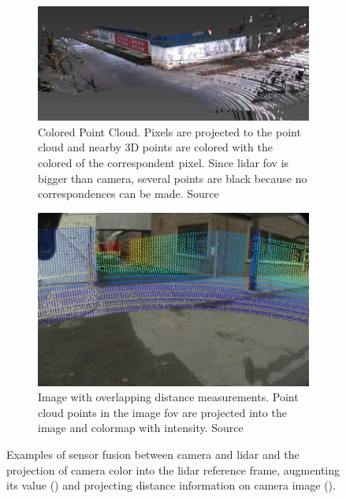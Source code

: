 \begin{figure}[H]
	\centering
	\begin{subfigure}[c]{0.55\textwidth}
		\includegraphics[width=\textwidth]{img/sensor_fusion/colored_point_cloud.png}
		\caption{Colored Point Cloud. Pixels are projected to the point cloud and nearby 3D points are colored with the colored of the correspondent pixel. Since \ac{lidar} \ac{fov} is bigger than camera, several points are black because no correspondences can be made. Source~\cite{Gong2013}}
		\label{fig:colored_point_cloud_example}
	\end{subfigure}
	\quad
	\begin{subfigure}[c]{0.40\textwidth}
		\includegraphics[width=\textwidth]{img/sensor_fusion/image_with_distance_point_cutted.png}
		\caption{Image with overlapping distance measurements. Point cloud points in the image \ac{fov} are projected into the image and colormap with intensity. Source~\cite{Bileschi2009}}
		\label{fig:image_with_lidar_distance}
	\end{subfigure}
	\caption{Examples of sensor fusion between camera and \ac{lidar} and the projection of camera color into the \ac{lidar} reference frame, augmenting its value () and projecting distance information on camera image ().}
	\label{fig:point_cloud_camera_fusion_example}
\end{figure}

